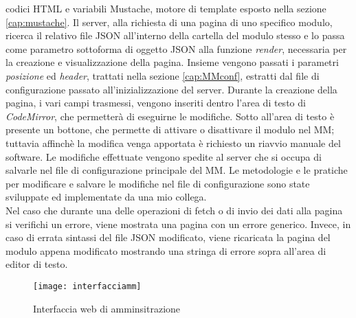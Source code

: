 codici HTML e variabili Mustache, motore di template esposto nella sezione \ref{cap:mustache}.
Il server, alla richiesta di una pagina di uno specifico modulo, ricerca il relativo file JSON all'interno della cartella del modulo stesso e lo
passa come parametro sottoforma di oggetto JSON alla funzione \textit{render}, necessaria per la creazione e visualizzazione della pagina.
Insieme vengono passati i parametri \textit{posizione} ed \textit{header}, trattati nella sezione \ref{cap:MMconf}, estratti dal file
di configurazione passato all'inizializzazione del server.
Durante la creazione della pagina, i vari campi trasmessi, vengono inseriti dentro l'area di testo di \textit{CodeMirror}, che permetter\`a di eseguirne
le modifiche. Sotto all'area di testo \`e presente un bottone, che permette di attivare o disattivare il modulo nel MM; tuttavia affinch\`e la modifica
venga apportata \`e richiesto un riavvio manuale del software.
Le modifiche effettuate vengono spedite al server che si occupa di salvarle nel file di configurazione
principale del MM. Le metodologie e le pratiche per modificare e salvare le modifiche nel file di configurazione sono state sviluppate ed
implementate da una mio collega.\\
Nel caso che durante una delle operazioni di fetch o di invio dei dati alla pagina si verifichi un errore, viene mostrata una pagina
con un errore generico. Invece, in caso di errata sintassi del file JSON modificato, viene ricaricata la pagina del modulo appena modificato
mostrando una stringa di errore sopra all'area di editor di testo.


\begin{figure}[H]
    \texttt{[image: interfacciamm]}
    \caption{Interfaccia web di amminsitrazione}
    \label{fig:interfaccia}
\end{figure}
